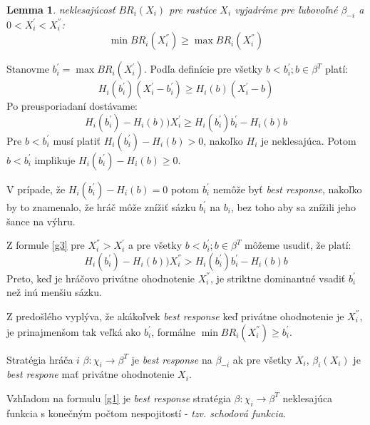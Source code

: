\documentclass[a4paper, 11pt]{article}
\newtheorem{lemma}[theorem]{Lemma}
\newenvironment{proof}[1][Proof]{\begin{trivlist}
\item[\hskip \labelsep {\bfseries #1}]}{\end{trivlist}}
\newcommand{\qed}{\nobreak \ifvmode \relax \else
      \ifdim\lastskip<1.5em \hskip-\lastskip
      \hskip1.5em plus0em minus0.5em \fi \nobreak
      \vrule height0.75em width0.5em depth0.25em\fi}
\begin{document}
\begin{lemma}
neklesajúcosť $BR_{i}(X_{i})$ pre rastúce $X_{i}$ vyjadríme pre ľubovoľné $\beta_{-i}$ a $0 < X_{i}^{'} < X_{i}^{''}$:
\begin{equation}
\min BR_{i}(X_{i}^{''}) \geq \max BR_{i}(X_{i}^{''})
\end{equation}
\end{lemma}
\begin{proof}
Stanovme $b_{i}^{'} = \max BR_{i}(X_{i}^{'})$. Podľa definície pre všetky $b < b_{i}^{'}; b \in \beta^{T}$ platí:
\begin{equation}
H_{i}(b_{i}^{'})(X_{i}^{'} - b_{i}^{'}) \geq H_{i}(b)(X_{i}^{'} - b)
\end{equation}
Po preusporiadaní dostávame:
\begin{equation}
\label{g3}
H_{i}(b_{i}^{'}) - H_{i}(b))X_{i}^{'} \geq H_{i}(b_{i}^{'})b_{i}^{'} - H_{i}(b)b
\end{equation}
Pre $b < b_{i}^{'}$ musí platiť $H_{i}(b_{i}^{'}) - H_{i}(b) > 0$, nakoľko $H_{i}$ je neklesajúca. Potom $b < b_{i}^{'}$ implikuje $H_{i}(b_{i}^{'}) - H_{i}(b) \geq 0$.

V prípade, že $H_{i}(b_{i}^{'}) - H_{i}(b) = 0$ potom $b_{i}^{'}$ nemôže byť \textit{best response}, nakoľko by to znamenalo, že hráč môže znížiť sázku $b_{i}^{'}$ na $b_{i}$, bez toho aby sa znížili jeho šance na výhru.

Z formule \ref{g3} pre $X_{i}^{''} > X_{i}^{'}$ a pre všetky $b < b^{'}_{i}; b \in \beta^{T}$ môžeme usudiť, že platí:
\begin{equation}
H_{i}(b_{i}^{'}) - H_{i}(b))X_{i}^{''} > H_{i}(b_{i}^{'})b_{i}^{'} - H_{i}(b)b
\end{equation}
Preto, keď je hráčovo privátne ohodnotenie $X_{i}^{''}$, je striktne dominantné vsadiť $b_{i}^{'}$ než inú menšiu sázku. 

Z predošlého vyplýva, že akákoľvek \textit{best response} keď privátne ohodnotenie je $X_{i}^{''}$, je prinajmenšom tak veľká ako $b_{i}^{'}$, formálne $\min BR_{i}(X_{i}^{''}) \geq b_{i}^{'}$. \qed
\end{proof}

Stratégia hráča $i$ $\beta:\chi_{i}\rightarrow \beta^{T}$ je \textit{best response} na $\beta_{-i}$ ak pre všetky $X_{i}$, $\beta_{i}(X_{i})$ je \textit{best respone} mať privátne ohodnotenie $X_{i}$.

Vzhľadom na formulu \ref{g1} je \textit{best response} stratégia $\beta:\chi_{i}\rightarrow \beta^{T}$ neklesajúca funkcia s konečným počtom nespojitostí - \textit{tzv. schodová funkcia}. 
\end{document}
